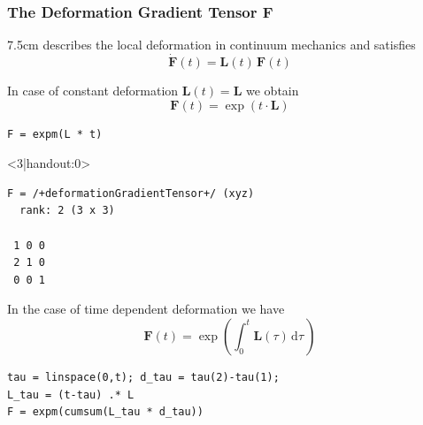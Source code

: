 \documentclass[compress,aspectratio=1610,fleqn]{beamer}
\begin{document}
\begin{frame}
  \frametitle{The Deformation Gradient Tensor $\mathbf F$}

  \begin{overlayarea}{\textwidth}{7.5cm}
    describes the local deformation in continuum mechanics and satisfies
    \begin{equation*}
      \dot{\mathbf F}(t) = \mathbf L(t) \, \mathbf F(t)
    \end{equation*}

    \pause

    In case of constant deformation $\mathbf L(t) = \mathbf L$ we obtain
  \begin{equation*}
    \mathbf F(t) = \exp(t \cdot \mathbf L)
  \end{equation*}
  \pause
  \vspace{-1cm}
\begin{lstlisting}[style=input]
F = expm(L * t)
\end{lstlisting}
  \begin{onlyenv}<3|handout:0>
    \vspace{-0.3cm}
\begin{lstlisting}[style=output]
F = /+deformationGradientTensor+/ (xyz)
  rank: 2 (3 x 3)

 1 0 0
 2 1 0
 0 0 1
\end{lstlisting}
  \end{onlyenv}

  \pause
  \medskip
  In the case of time dependent deformation we have
  \begin{equation*}
    \mathbf F(t) = \exp\left( \int_{0}^{t} \mathbf L(\tau) \, \mathrm d \tau \,\right)
  \end{equation*}
  \vspace{-0.5cm}
\begin{lstlisting}[style=input]
tau = linspace(0,t); d_tau = tau(2)-tau(1);
L_tau = (t-tau) .* L
F = expm(cumsum(L_tau * d_tau))
\end{lstlisting}





\end{overlayarea}
\end{frame}
\end{document}
